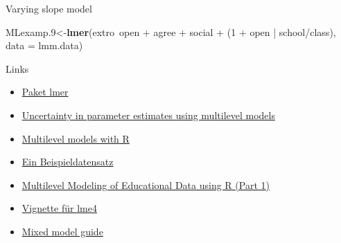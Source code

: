 \documentclass[ignorenonframetext,]{beamer}
\newenvironment{Shaded}{}{}
\newcommand{\KeywordTok}[1]{\textcolor[rgb]{0.00,0.44,0.13}{\textbf{{#1}}}}
\newcommand{\DataTypeTok}[1]{\textcolor[rgb]{0.56,0.13,0.00}{{#1}}}
\newcommand{\DecValTok}[1]{\textcolor[rgb]{0.25,0.63,0.44}{{#1}}}
\newcommand{\FloatTok}[1]{\textcolor[rgb]{0.25,0.63,0.44}{{#1}}}
\newcommand{\StringTok}[1]{\textcolor[rgb]{0.25,0.44,0.63}{{#1}}}
\newcommand{\NormalTok}[1]{{#1}}
\begin{document}
\begin{frame}[fragile]{Varying slope model}

\begin{Shaded}
\begin{Highlighting}[]
\NormalTok{MLexamp}\FloatTok{.9}\NormalTok{<-}\KeywordTok{lmer}\NormalTok{(extro~open +}\StringTok{ }\NormalTok{agree +}\StringTok{ }\NormalTok{social +}\StringTok{ }
\StringTok{                  }\NormalTok{(}\DecValTok{1} \NormalTok{+}\StringTok{ }\NormalTok{open |}\StringTok{ }\NormalTok{school/class), }
                \DataTypeTok{data =} \NormalTok{lmm.data)}
\end{Highlighting}
\end{Shaded}

\end{frame}

\begin{frame}{Links}

\begin{itemize}
\item
  \href{https://cran.r-project.org/doc/contrib/Bliese_Multilevel.pdf}{Paket
  lmer}
\item
  \href{https://www.r-bloggers.com/uncertainty-in-parameter-estimates-using-multilevel-models/}{Uncertainty
  in parameter estimates using multilevel models}
\item
  \href{https://cran.r-project.org/doc/contrib/Bliese_Multilevel.pdf}{Multilevel
  models with R}
\item
  \href{https://www.jaredknowles.com/journal/2013/11/25/getting-started-with-mixed-effect-models-in-r}{Ein
  Beispieldatensatz}
\item
  \href{https://www.r-bloggers.com/multilevel-modeling-of-educational-data-using-r-part-1/}{Multilevel
  Modeling of Educational Data using R (Part 1)}
\item
  \href{https://cran.r-project.org/web/packages/lme4/vignettes/lmer.pdf}{Vignette
  für lme4}
\item
  \href{http://ase.tufts.edu/gsc/gradresources/guidetomixedmodelsinr/mixed\%20model\%20guide.html}{Mixed
  model guide}
\end{itemize}

\end{frame}
\end{document}
